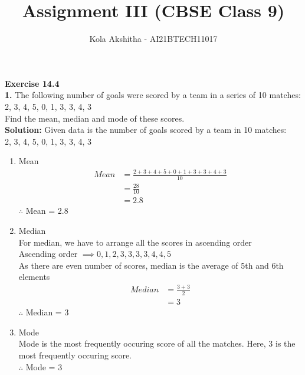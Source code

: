 \documentclass[journal,12pt,twocolumn]{IEEEtran}
\title{Assignment III (CBSE Class 9)}
\author{Kola Akshitha - AI21BTECH11017}
\begin{document}
\maketitle 
\textbf{Exercise 14.4} \\
\textbf{1.}
The following number of goals were scored by a team in a series of 10 matches: \\
2, 3, 4, 5, 0, 1, 3, 3, 4, 3  \\
Find the mean, median and mode of these scores. \\
\textbf{Solution:}
Given data is the number of goals scored by a team in 10 matches: \\
2, 3, 4, 5, 0, 1, 3, 3, 4, 3  
\begin{enumerate}[label=(\roman{enumi})]
\item Mean \\
\begin{align}
Mean &= \frac{2+3+4+5+0+1+3+3+4+3}{10} \nonumber\\
&= \frac{28}{10} \nonumber\\
&= 2.8 \nonumber
\end{align}
$\therefore$ Mean = 2.8 \\
\item Median \\
For median, we have to arrange all the scores in ascending order \\
Ascending order $\implies 0, 1, 2, 3, 3, 3, 3, 4, 4, 5$ \\
As there are even number of scores, median is the average of 5th and 6th elements \\
\begin{align}
Median &= \frac{3+3}{2} \nonumber\\
&= 3 \nonumber
\end{align}
$\therefore$ Median = 3 \\
\item Mode \\
Mode is the most frequently occuring score of all the matches.
Here, 3 is the most frequently occuring score. \\
$\therefore$ Mode = 3
\end{enumerate}
\end{document}
